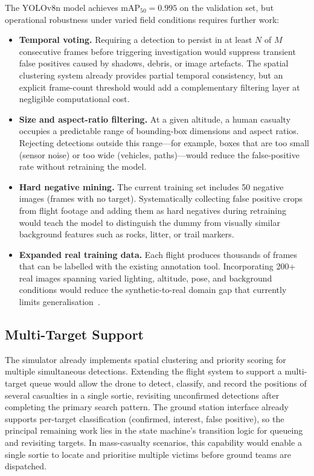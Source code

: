 The YOLOv8n model achieves $\text{mAP}_{50} = 0.995$ on the validation set, but operational robustness under varied field conditions requires further work:

\begin{itemize}
    \item \textbf{Temporal voting.} Requiring a detection to persist in at least $N$ of $M$ consecutive frames before triggering investigation would suppress transient false positives caused by shadows, debris, or image artefacts. The spatial clustering system already provides partial temporal consistency, but an explicit frame-count threshold would add a complementary filtering layer at negligible computational cost.
    \item \textbf{Size and aspect-ratio filtering.} At a given altitude, a human casualty occupies a predictable range of bounding-box dimensions and aspect ratios. Rejecting detections outside this range---for example, boxes that are too small (sensor noise) or too wide (vehicles, paths)---would reduce the false-positive rate without retraining the model.
    \item \textbf{Hard negative mining.} The current training set includes 50 negative images (frames with no target). Systematically collecting false positive crops from flight footage and adding them as hard negatives during retraining would teach the model to distinguish the dummy from visually similar background features such as rocks, litter, or trail markers.
    \item \textbf{Expanded real training data.} Each flight produces thousands of frames that can be labelled with the existing annotation tool. Incorporating 200+ real images spanning varied lighting, altitude, pose, and background conditions would reduce the synthetic-to-real domain gap that currently limits generalisation~\cite{tremblay2018training}.
\end{itemize}

\subsection{Multi-Target Support}\label{sec:future-multi}

The simulator already implements spatial clustering and priority scoring for multiple simultaneous detections. Extending the flight system to support a multi-target queue would allow the drone to detect, classify, and record the positions of several casualties in a single sortie, revisiting unconfirmed detections after completing the primary search pattern. The ground station interface already supports per-target classification (confirmed, interest, false positive), so the principal remaining work lies in the state machine's transition logic for queueing and revisiting targets. In mass-casualty scenarios, this capability would enable a single sortie to locate and prioritise multiple victims before ground teams are dispatched.

